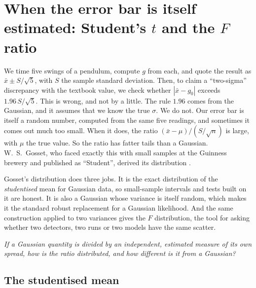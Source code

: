 \section{When the error bar is itself estimated: Student's \texorpdfstring{$t$}{t} and the \texorpdfstring{$F$}{F} ratio}
\label{2b:sec:t}

We time five swings of a pendulum, compute $g$ from each, and quote the result as $\bar x\pm S/\sqrt5$, with $S$ the sample standard deviation. Then, to claim a ``two-sigma'' discrepancy with the textbook value, we check whether $|\bar x-g_0|$ exceeds $1.96\,S/\sqrt5$. This is wrong, and not by a little. The rule $1.96$ comes from the Gaussian, and it assumes that we know the true $\sigma$. We do not. Our error bar is itself a random number, computed from the same five readings, and sometimes it comes out much too small. When it does, the ratio $(\bar x-\mu)/(S/\sqrt n)$ is large, with $\mu$ the true value. So the ratio has fatter tails than a Gaussian. W.~S.~Gosset, who faced exactly this with small samples at the Guinness brewery and published as ``Student'', derived its distribution .

Gosset's distribution does three jobs. It is the exact distribution of the \emph{studentised} mean for Gaussian data, so small-sample intervals and tests built on it are honest. It is also a Gaussian whose variance is itself random, which makes it the standard robust replacement for a Gaussian likelihood. And the same construction applied to two variances gives the $F$ distribution, the tool for asking whether two detectors, two runs or two models have the same scatter.

\emph{If a Gaussian quantity is divided by an independent, estimated measure of its own spread, how is the ratio distributed, and how different is it from a Gaussian?}

\subsection{The studentised mean}
\label{2b:sec:t-derive}

